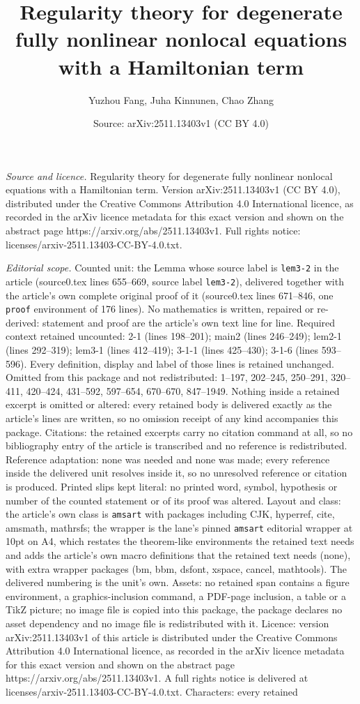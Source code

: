 \documentclass[10pt,a4paper]{amsart}
\title[Regularity theory for degenerate fully nonlinear nonlocal eq]{Regularity theory for degenerate fully nonlinear nonlocal equations with a Hamiltonian term}
\author{Yuzhou Fang, Juha Kinnunen, Chao Zhang}
\date{Source: arXiv:2511.13403v1 (CC BY 4.0)}
\begin{document}
\maketitle

\noindent\emph{Source and licence.} Regularity theory for degenerate fully nonlinear nonlocal equations with a Hamiltonian term. Version arXiv:2511.13403v1 (CC BY 4.0), distributed under the Creative Commons Attribution 4.0 International licence, as recorded in the arXiv licence metadata for this exact version and shown on the abstract page https://arxiv.org/abs/2511.13403v1. Full rights notice: licenses/arxiv-2511.13403-CC-BY-4.0.txt.\par\smallskip

\noindent\textit{Editorial scope.} Counted unit: the Lemma whose source label is \texttt{lem3-2} in the article (source0.tex lines 655--669, source label \texttt{lem3-2}), delivered together with the article's own complete original proof of it (source0.tex lines 671--846, one \texttt{proof} environment of 176 lines). No mathematics is written, repaired or re-derived: statement and proof are the article's own text line for line. Required context retained uncounted: 2-1 (lines 198--201); main2 (lines 246--249); lem2-1 (lines 292--319); lem3-1 (lines 412--419); 3-1-1 (lines 425--430); 3-1-6 (lines 593--596). Every definition, display and label of those lines is retained unchanged. Omitted from this package and not redistributed: 1--197, 202--245, 250--291, 320--411, 420--424, 431--592, 597--654, 670--670, 847--1949. Nothing inside a retained excerpt is omitted or altered: every retained body is delivered exactly as the article's lines are written, so no omission receipt of any kind accompanies this package. Citations: the retained excerpts carry no citation command at all, so no bibliography entry of the article is transcribed and no reference is redistributed. Reference adaptation: none was needed and none was made; every reference inside the delivered unit resolves inside it, so no unresolved reference or citation is produced. Printed slips kept literal: no printed word, symbol, hypothesis or number of the counted statement or of its proof was altered. Layout and class: the article's own class is \texttt{amsart} with packages including CJK, hyperref, cite, amsmath, mathrsfs; the wrapper is the lane's pinned \texttt{amsart} editorial wrapper at 10pt on A4, which restates the theorem-like environments the retained text needs and adds the article's own macro definitions that the retained text needs (none), with extra wrapper packages (bm, bbm, dsfont, xspace, cancel, mathtools). The delivered numbering is the unit's own. Assets: no retained span contains a figure environment, a graphics-inclusion command, a PDF-page inclusion, a table or a TikZ picture; no image file is copied into this package, the package declares no asset dependency and no image file is redistributed with it. Licence: version arXiv:2511.13403v1 of this article is distributed under the Creative Commons Attribution 4.0 International licence, as recorded in the arXiv licence metadata for this exact version and shown on the abstract page https://arxiv.org/abs/2511.13403v1. A full rights notice is delivered at licenses/arxiv-2511.13403-CC-BY-4.0.txt. Characters: every retained 
\end{document}
